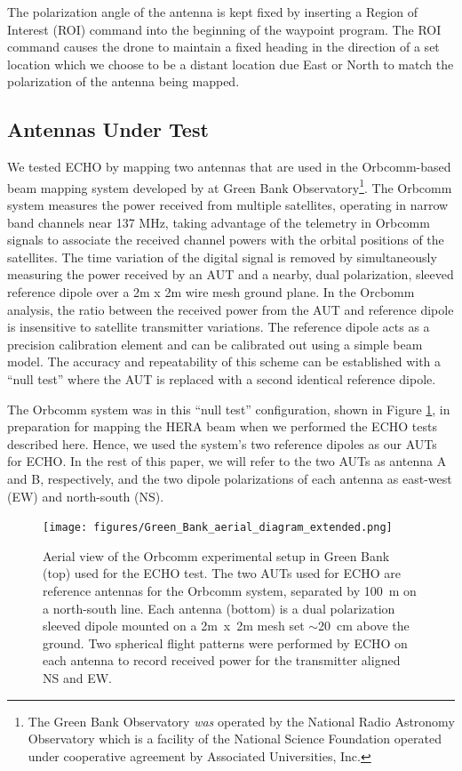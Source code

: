 \documentclass[preprint2,numberedappendix,tighten,twocolappendix]{aastex6}
\begin{document}
The polarization angle of the antenna is kept fixed by inserting a Region of Interest (ROI) command into the beginning of the waypoint program.  The ROI command causes the drone to maintain a fixed heading in the direction of a set location which we choose to be a distant location due East or North to match the polarization of the antenna being mapped.


\subsection{Antennas Under Test}

We tested ECHO by mapping two antennas that are used in the Orbcomm-based beam mapping system developed by \citet{2015RaSc...50..614N,2016:NebenHERAdish} at Green Bank Observatory\footnote{The Green Bank Observatory \emph{was} operated by the National Radio Astronomy Observatory which is a facility of the National Science Foundation operated under cooperative agreement by Associated Universities, Inc.}.  The Orbcomm system measures the power received from multiple satellites, operating in narrow band channels near 137 MHz, taking advantage of the telemetry in Orbcomm signals to associate the received channel powers with the orbital positions of the satellites.   The time variation of the digital signal is removed by simultaneously measuring the power received by an AUT and a nearby, dual polarization, sleeved reference dipole over a 2m x 2m wire mesh ground plane.  In the Orcbomm analysis, the ratio between the received power from the AUT and reference dipole is insensitive to satellite transmitter variations. The reference dipole acts as a precision calibration element and can be calibrated out using a simple beam model.  The accuracy and repeatability of this scheme can be established with a ``null test'' where the AUT is replaced with a second identical reference dipole.  

The Orbcomm system was in this ``null test'' configuration, shown in Figure \ref{fig:GB_aerial}, in preparation for mapping the HERA beam \citep{2016:NebenHERAdish} when we performed the ECHO tests described here.   Hence, we used the system's two reference dipoles as our AUTs for ECHO.  In the rest of this paper, we will refer to the two AUTs as antenna A and B, respectively, and the two dipole polarizations of each antenna as east-west (EW) and north-south (NS).

\begin{figure}
\begin{center}
\texttt{[image: figures/Green\_Bank\_aerial\_diagram\_extended.png]}
\caption{Aerial view of the Orbcomm experimental setup in Green Bank (top) used for the ECHO test.  The two AUTs used for ECHO are reference antennas for the Orbcomm system, separated by 100~m on a north-south line. Each antenna (bottom) is a dual polarization sleeved dipole mounted on a 2m~x~2m mesh set $\sim$20~cm above the ground.  Two spherical flight patterns were performed by ECHO on each antenna to record received power for the transmitter aligned NS and EW.  }
\label{fig:GB_aerial}
\end{center}
\end{figure}
\end{document}
